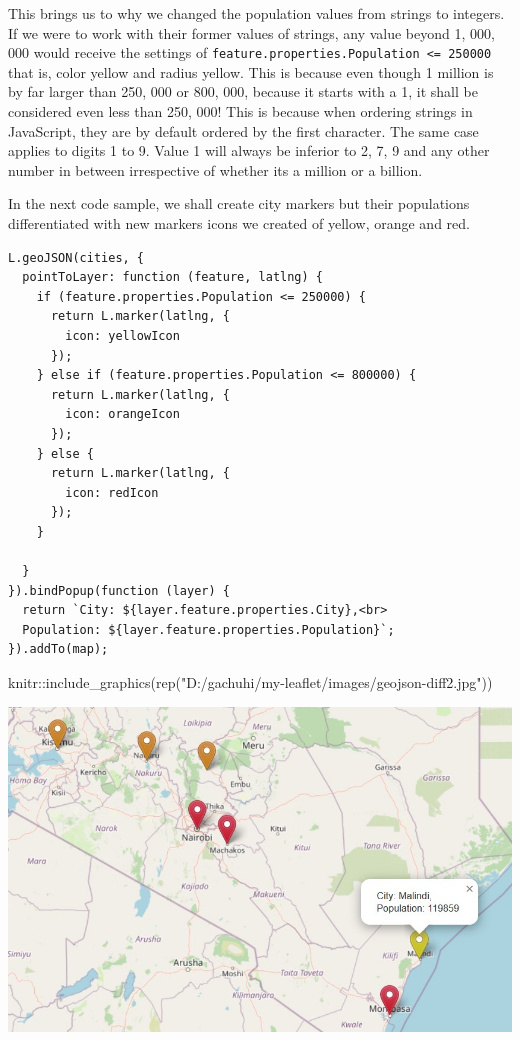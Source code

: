 \documentclass[
]{book}
\newenvironment{Shaded}{\begin{snugshade}}{\end{snugshade}}
\newcommand{\FunctionTok}[1]{\textcolor[rgb]{0.00,0.00,0.00}{#1}}
\newcommand{\NormalTok}[1]{#1}
\newcommand{\SpecialCharTok}[1]{\textcolor[rgb]{0.00,0.00,0.00}{#1}}
\newcommand{\StringTok}[1]{\textcolor[rgb]{0.31,0.60,0.02}{#1}}
\begin{document}
This brings us to why we changed the population values from strings to integers. If we were to work with their former values of strings, any value beyond 1, 000, 000 would receive the settings of \texttt{feature.properties.Population\ \textless{}=\ 250000} that is, color yellow and radius yellow. This is because even though 1 million is by far larger than 250, 000 or 800, 000, because it starts with a 1, it shall be considered even less than 250, 000! This is because when ordering strings in JavaScript, they are by default ordered by the first character. The same case applies to digits 1 to 9. Value 1 will always be inferior to 2, 7, 9 and any other number in between irrespective of whether its a million or a billion.

In the next code sample, we shall create city markers but their populations differentiated with new markers icons we created of yellow, orange and red.

\begin{verbatim}
L.geoJSON(cities, {
  pointToLayer: function (feature, latlng) {
    if (feature.properties.Population <= 250000) {
      return L.marker(latlng, {
        icon: yellowIcon 
      });
    } else if (feature.properties.Population <= 800000) {
      return L.marker(latlng, {
        icon: orangeIcon 
      });
    } else {
      return L.marker(latlng, {
        icon: redIcon 
      });
    }
    
  }
}).bindPopup(function (layer) {
  return `City: ${layer.feature.properties.City},<br>
  Population: ${layer.feature.properties.Population}`;
}).addTo(map);
\end{verbatim}

\begin{Shaded}
\begin{Highlighting}[]
\NormalTok{knitr}\SpecialCharTok{::}\FunctionTok{include\_graphics}\NormalTok{(}\FunctionTok{rep}\NormalTok{(}\StringTok{"D:/gachuhi/my{-}leaflet/images/geojson{-}diff2.jpg"}\NormalTok{))}
\end{Highlighting}
\end{Shaded}

\includegraphics[width=11.78in]{../images/geojson-diff2}
\end{document}
